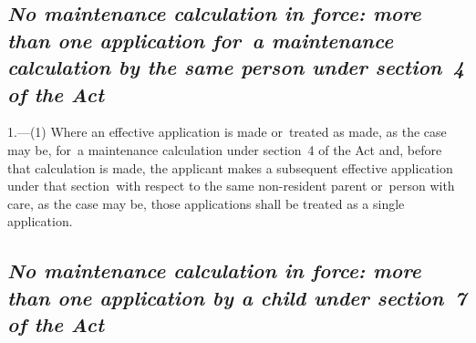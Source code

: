 \documentclass[12pt,a4paper]{article}
\begin{document}
\renewcommand\parthead{--- Schedule~2}

\subsection*{\itshape No maintenance calculation in force: more than one application for~a maintenance calculation by the same person under section~4 
of the Act}

1.---(1)  Where an effective application is made or~treated as made, as the case may be, for~a maintenance calculation under section~4 
of the Act and, before that calculation is made, the applicant makes a subsequent effective application under that section~with respect to the same non-resident parent or~person with care, as the case may be, those applications shall be treated as a single application.

%
%


\subsection*{\itshape No maintenance calculation in force: more than one application by a child under section~7 of the Act}
\end{document}
